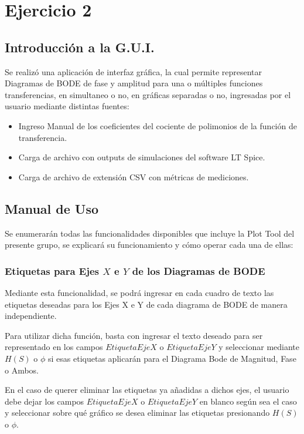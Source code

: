 \section{Ejercicio 2}

\subsection{Introducción a la G.U.I.}

Se realizó una aplicación de interfaz gráfica, la cual permite representar Diagramas de BODE de fase y amplitud para una o múltiples funciones transferencias, en simultaneo o no, en gráficas separadas o no, ingresadas por el usuario mediante distintas fuentes:

\begin{itemize}
    \item Ingreso Manual de los coeficientes del cociente de polimonios de la función de transferencia.
    \item Carga de archivo con outputs de simulaciones del software LT Spice.
    \item Carga de archivo de extensión CSV con métricas de mediciones. 

\end{itemize}

\subsection{Manual de Uso}

Se enumerarán todas las funcionalidades disponibles que incluye la Plot Tool del presente grupo, se explicará su funcionamiento y cómo operar cada una de ellas:

\subsubsection{Etiquetas para Ejes $X$ e $Y$ de los Diagramas de BODE}

Mediante esta funcionalidad, se podrá ingresar en cada cuadro de texto las etiquetas deseadas para los Ejes X e Y de cada diagrama de BODE de manera independiente. 

Para utilizar dicha función, basta con ingresar el texto deseado para ser representado en los campos $Etiqueta Eje X$ o $Etiqueta Eje Y$ y seleccionar mediante $H(S)$ o $\phi$ si esas etiquetas aplicarán para el Diagrama Bode de Magnitud, Fase o Ambos.

En el caso de querer eliminar las etiquetas ya añadidas a dichos ejes, el usuario debe dejar los campos $Etiqueta Eje X$ o $Etiqueta Eje Y$  en blanco según sea el caso y seleccionar sobre qué gráfico se desea eliminar las etiquetas presionando $H(S)$ o $\phi$.

